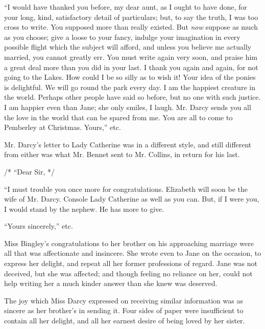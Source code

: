 ``I would have thanked you before, my dear aunt, as I ought to have done, for your long, kind, satisfactory detail of particulars; but, to say the truth, I was too cross to write. You supposed more than really existed. But \textit{now} suppose as much as you choose; give a loose to your fancy, indulge your imagination in every possible flight which the subject will afford, and unless you believe me actually married, you cannot greatly err. You must write again very soon, and praise him a great deal more than you did in your last. I thank you again and again, for not going to the Lakes. How could I be so silly as to wish it! Your idea of the ponies is delightful. We will go round the park every day. I am the happiest creature in the world. Perhaps other people have said so before, but no one with such justice. I am happier even than Jane; she only smiles, I laugh. Mr. Darcy sends you all the love in the world that can be spared from me. You are all to come to Pemberley at Christmas. Yours,'' etc.

Mr. Darcy's letter to Lady Catherine was in a different style, and still different from either was what Mr. Bennet sent to Mr. Collins, in return for his last.

/* ``Dear Sir, */

``I must trouble you once more for congratulations. Elizabeth will soon be the wife of Mr. Darcy. Console Lady Catherine as well as you can. But, if I were you, I would stand by the nephew. He has more to give.

``Yours sincerely,'' etc.

Miss Bingley's congratulations to her brother on his approaching marriage were all that was affectionate and insincere. She wrote even to Jane on the occasion, to express her delight, and repeat all her former professions of regard. Jane was not deceived, but she was affected; and though feeling no reliance on her, could not help writing her a much kinder answer than she knew was deserved.

The joy which Miss Darcy expressed on receiving similar information was as sincere as her brother's in sending it. Four sides of paper were insufficient to contain all her delight, and all her earnest desire of being loved by her sister.

